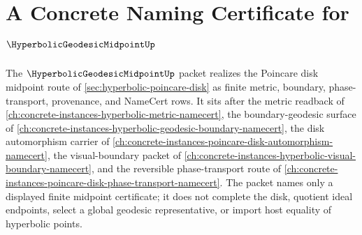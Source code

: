 \chapter{A Concrete Naming Certificate for $\HyperbolicGeodesicMidpointUp$}
\label{ch:concrete-instances-hyperbolic-geodesic-midpoint-namecert}

The $\HyperbolicGeodesicMidpointUp$ packet realizes the Poincare disk midpoint route of \autoref{sec:hyperbolic-poincare-disk} as finite metric, boundary, phase-transport, provenance, and NameCert rows. It sits after the metric readback of \autoref{ch:concrete-instances-hyperbolic-metric-namecert}, the boundary-geodesic surface of \autoref{ch:concrete-instances-hyperbolic-geodesic-boundary-namecert}, the disk automorphism carrier of \autoref{ch:concrete-instances-poincare-disk-automorphism-namecert}, the visual-boundary packet of \autoref{ch:concrete-instances-hyperbolic-visual-boundary-namecert}, and the reversible phase-transport route of \autoref{ch:concrete-instances-poincare-disk-phase-transport-namecert}. The packet names only a displayed finite midpoint certificate; it does not complete the disk, quotient ideal endpoints, select a global geodesic representative, or import host equality of hyperbolic points.


